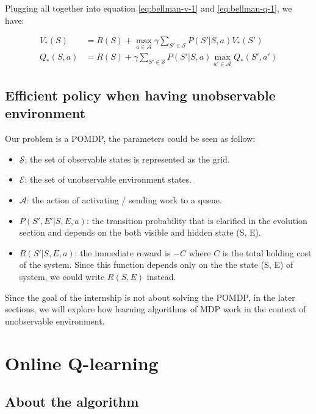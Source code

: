 \documentclass[
  a4paper, xcolor = usenames,dvipsnames]{article}
\providecommand{\tightlist}{%
  \setlength{\itemsep}{0pt}\setlength{\parskip}{0pt}}
\begin{document}
Plugging all together into equation \eqref{eq:bellman-v-1} and \eqref{eq:bellman-q-1}, we have:

\begin{align}
V_{*}(S) &= R(S) + \max_{a \in \mathcal{A}} \gamma \sum_{S' \in \mathcal{S}} P(S' | S, a) V_{*}(S')
\label{eq:bellman-max-v} \\
Q_{*}(S, a) &= R(S) + \gamma \sum_{S' \in \mathcal{S}} P(S' | S, a) \max_{a' \in \mathcal{A}} Q_{*}(S', a')
\label{eq:bellman-max-q}
\end{align}

\hypertarget{efficient-policy-when-having-unobservable-environment}{%
\subsection{Efficient policy when having unobservable environment}\label{efficient-policy-when-having-unobservable-environment}}

Our problem is a POMDP, the parameters could be seen as follow:

\begin{itemize}
\tightlist
\item
  \(\mathcal{S}\): the set of observable states is represented as the grid.
\item
  \(\mathcal{E}\): the set of unobservable environment states.
\item
  \(\mathcal{A}\): the action of activating / sending work to a queue.
\item
  \(P(S', E' | S, E, a)\): the transition probability that is clarified in the evolution section and depends on the both visible and hidden state (S, E).
\item
  \(R(S' | S, E, a)\): the immediate reward is \(-C\) where \(C\) is the total holding cost of the system. Since this function depends only on the the state (S, E) of system, we could write \(R(S, E)\) instead.
\end{itemize}

Since the goal of the internship is not about solving the POMDP, in the later sections, we will explore how learning algorithms of MDP work in the context of unobservable environment.

\hypertarget{online-q-learning}{%
\section{Online Q-learning}\label{online-q-learning}}

\hypertarget{about-the-algorithm}{%
\subsection{About the algorithm}\label{about-the-algorithm}}
\end{document}
